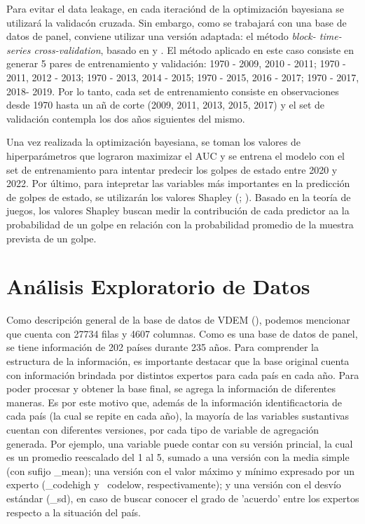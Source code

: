 \documentclass{article}
\begin{document}
Para evitar el data leakage, en cada iteraciónd de la optimización bayesiana
se utilizará la validacón cruzada. Sin embargo, como se trabajará con una base
de datos de panel, conviene utilizar una versión adaptada: el método \textit{block-
time-series cross-validation}, basado en \cite{Bur94} y \cite{RAc00}. El método 
aplicado en este caso consiste en generar 5 pares de entrenamiento y validación: 
{1970 - 2009, 2010 - 2011}; {1970 - 2011, 2012 - 2013}; {1970 - 2013, 2014 - 2015}; 
{1970 - 2015, 2016 - 2017}; {1970 - 2017, 2018- 2019}. Por lo tanto, cada set de 
entrenamiento consiste en observaciones desde 1970 hasta un añ de corte (2009, 
2011, 2013, 2015, 2017) y el set de validación contempla los dos años siguientes 
del mismo.

Una vez realizada la optimización bayesiana, se toman los valores de hiperparámetros
que lograron maximizar el AUC y se entrena el modelo con el set de entrenamiento para
intentar predecir los golpes de estado entre 2020 y 2022. Por último, para intepretar
las variables más importantes en la predicción de golpes de estado, se utilizarán los
valores Shapley (\cite{Str10}; \cite{Lun17}). Basado en la teoría de juegos, los
valores Shapley buscan medir la contribución de cada predictor aa la probabilidad de
un golpe en relación con la probabilidad promedio de la muestra prevista de un golpe.

\section{Análisis Exploratorio de Datos}

Como descripción general de la base de datos de VDEM (\cite{Cop24}), podemos 
mencionar que cuenta con 27734 filas y 4607 columnas. Como es una base de datos 
de panel, se tiene información de 202 países durante 235 años. Para comprender la 
estructura de la información, es importante destacar que la base original cuenta 
con información brindada por distintos expertos para cada país en cada año. Para 
poder procesar y obtener la base final, se agrega la información de diferentes 
maneras. Es por este motivo que, además de la información identificactoria de 
cada país (la cual se repite en cada año), la mayoría de las variables sustantivas 
cuentan con diferentes versiones, por cada tipo de variable de agregación generada. 
Por ejemplo, una variable puede contar con su versión princial, la cual es un 
promedio reescalado del 1 al 5, sumado a una versión con la media simple (con 
sufijo \_mean); una versión con el valor máximo y mínimo expresado por un experto 
(\_codehigh y \ codelow, respectivamente); y una versión con el desvío estándar 
(\_sd), en caso de buscar conocer el grado de 'acuerdo' entre los expertos respecto 
a la situación del país.
\end{document}
